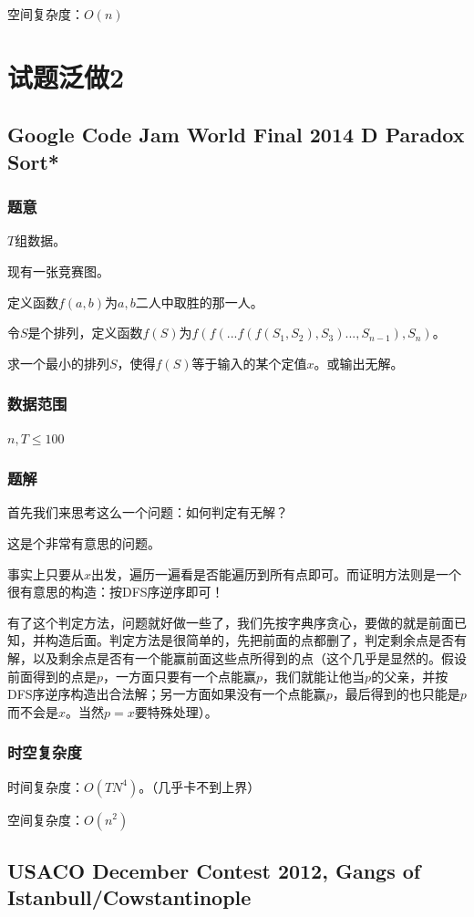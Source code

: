 \documentclass{ctexart}
\begin{document}
空间复杂度：$O(n)$
\newpage
\section{试题泛做2}
\subsection{Google Code Jam World Final 2014 D Paradox Sort*}
\subsubsection{题意}
$T$组数据。

现有一张竞赛图。

定义函数$f(a,b)$为$a,b$二人中取胜的那一人。

令$S$是个排列，定义函数$f(S)$为$f(f(...f(f(S_1,S_2),S_3)...,S_{n-1}),S_n)$。

求一个最小的排列$S$，使得$f(S)$等于输入的某个定值$x$。或输出无解。
\subsubsection{数据范围}
$n,T \le 100$
\subsubsection{题解}
首先我们来思考这么一个问题：如何判定有无解？

这是个非常有意思的问题。

事实上只要从$x$出发，遍历一遍看是否能遍历到所有点即可。而证明方法则是一个很有意思的构造：按DFS序逆序即可！

有了这个判定方法，问题就好做一些了，我们先按字典序贪心，要做的就是前面已知，并构造后面。判定方法是很简单的，先把前面的点都删了，判定剩余点是否有解，以及剩余点是否有一个能赢前面这些点所得到的点（这个几乎是显然的。假设前面得到的点是$p$，一方面只要有一个点能赢$p$，我们就能让他当$p$的父亲，并按DFS序逆序构造出合法解；另一方面如果没有一个点能赢$p$，最后得到的也只能是$p$而不会是$x$。当然$p=x$要特殊处理）。
\subsubsection{时空复杂度}
时间复杂度：$O(TN^4)$。（几乎卡不到上界）

空间复杂度：$O(n^2)$
\subsection{USACO December Contest 2012, Gangs of Istanbull/Cowstantinople}
\end{document}
